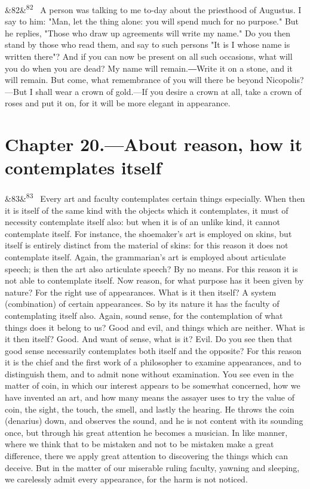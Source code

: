 \documentclass[12pt]{article}
\newcommand{\para}[1][]{\par\noindent\ifx&#1&\else\textsuperscript{\footnotesize #1}~\fi}
\begin{document}
\para[82] A person was talking to me to-day about the priesthood of Augustus. I say to him: "Man, let the thing alone: you will spend much for no purpose." But he replies, "Those who draw up agreements will write my name." Do you then stand by those who read them, and say to such persons "It is I whose name is written there"? And if you can now be present on all such occasions, what will you do when you are dead? My name will remain.―Write it on a stone, and it will remain. But come, what remembrance of you will there be beyond Nicopolis?—But I shall wear a crown of gold.—If you desire a crown at all, take a crown of roses and put it on, for it will be more elegant in appearance.

\section*{Chapter 20.---About reason, how it contemplates itself}

\para[83] Every art and faculty contemplates certain things especially. When then it is itself of the same kind with the objects which it contemplates, it must of necessity contemplate itself also: but when it is of an unlike kind, it cannot contemplate itself. For instance, the shoemaker's art is employed on skins, but itself is entirely distinct from the material of skins: for this reason it does not contemplate itself. Again, the grammarian's art is employed about articulate speech; is then the art also articulate speech? By no means. For this reason it is not able to contemplate itself. Now reason, for what purpose has it been given by nature? For the right use of appearances. What is it then itself? A system (combination) of certain appearances. So by its nature it has the faculty of contemplating itself also. Again, sound sense, for the contemplation of what things does it belong to us? Good and evil, and things which are neither. What is it then itself? Good. And want of sense, what is it? Evil. Do you see then that good sense necessarily contemplates both itself and the opposite? For this reason it is the chief and the first work of a philosopher to examine appearances, and to distinguish them, and to admit none without examination. You see even in the matter of coin, in which our interest appears to be somewhat concerned, how we have invented an art, and how many means the assayer uses to try the value of coin, the sight, the touch, the smell, and lastly the hearing. He throws the coin (denarius) down, and observes the sound, and he is not content with its sounding once, but through his great attention he becomes a musician. In like manner, where we think that to be mistaken and not to be mistaken make a great difference, there we apply great attention to discovering the things which can deceive. But in the matter of our miserable ruling faculty, yawning and sleeping, we carelessly admit every appearance, for the harm is not noticed.
\end{document}

